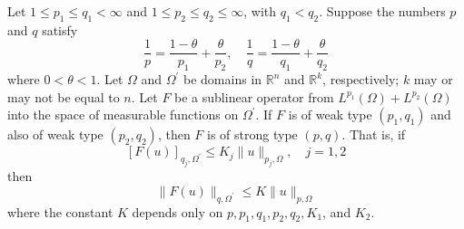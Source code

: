 \begin{theorem}
  Let $1 \leq p_1 \leq q_1<\infty$ and $1 \leq p_2 \leq q_2 \leq \infty$, with $q_1<q_2$. Suppose the numbers $p$ and $q$ satisfy
  \[
  \frac{1}{p}=\frac{1-\theta}{p_1}+\frac{\theta}{p_2}, \quad \frac{1}{q}=\frac{1-\theta}{q_1}+\frac{\theta}{q_2}
  \]
  where $0<\theta<1$. Let $\Omega$ and $\Omega^{\prime}$ be domains in $\mathbb{R}^n$ and $\mathbb{R}^k$, respectively; $k$ may or may not be equal to $n$. Let $F$ be a sublinear operator from $L^{p_1}(\Omega)+L^{p_2}(\Omega)$ into the space of measurable functions on $\Omega^{\prime}$. If $F$ is of weak type $\left(p_1, q_1\right)$ and also of weak type $\left(p_2, q_2\right)$, then $F$ is of strong type $(p, q)$. That is, if
  \[
  [F(u)]_{q_j, \Omega^{\prime}} \leq K_j\|u\|_{p_j, \Omega}, \quad j=1,2
  \]
  then
  \[
  \|F(u)\|_{q, \Omega^{\prime}} \leq K\|u\|_{p, \Omega}
  \]
  where the constant $K$ depends only on $p, p_1, q_1, p_2, q_2, K_1$, and $K_2$.
\end{theorem}

